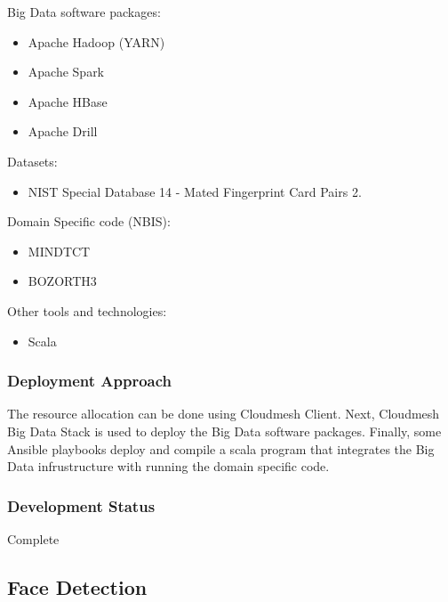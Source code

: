 \documentclass[9pt,twocolumn,twoside]{styles/osajnl}
\begin{document}
Big Data software packages:

\begin{itemize}
\item Apache Hadoop (YARN)
\item Apache Spark
\item Apache HBase
\item Apache Drill
\end{itemize}

Datasets:
\begin{itemize}
\item NIST Special Database 14 - Mated Fingerprint Card Pairs 2.
\end{itemize}

Domain Specific code (NBIS):
\begin{itemize}
\item MINDTCT
\item BOZORTH3
\end{itemize}


Other tools and technologies:
\begin{itemize}
\item Scala
\end{itemize}

\subsubsection{Deployment Approach}

The resource allocation can be done using Cloudmesh Client.
Next, Cloudmesh Big Data Stack is used to deploy the Big Data software packages.
Finally, some Ansible playbooks deploy and compile a scala program that integrates the Big Data infrustructure with running the domain specific code.

\subsubsection{Development Status}

Complete




\subsection{Face Detection}
\end{document}
